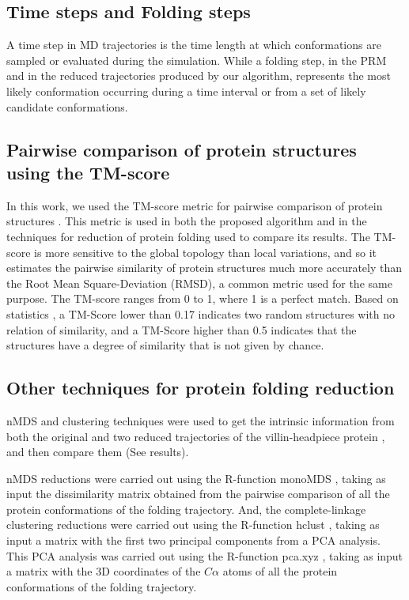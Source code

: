 \documentclass[american,twocolumn]{bmcart}
\begin{document}
\subsection*{Time steps and Folding steps}

A time step in MD trajectories is the time length at which conformations are sampled or evaluated during the simulation. While a folding step, in the PRM and in the reduced trajectories produced by our algorithm, represents the most likely conformation occurring during a time interval or from a set of likely candidate conformations.

\subsection*{Pairwise comparison of protein structures using the TM-score \label{sec:Comparing-Structures}}

In this work, we used the TM-score metric for pairwise comparison of protein structures \cite{Zhang2004}. This metric is used in both the proposed algorithm and in the techniques for reduction of protein folding used to compare its results. The TM-score is more sensitive to the global topology than local variations, and so it estimates the pairwise similarity of protein structures much more accurately than the Root Mean Square-Deviation (RMSD), a common metric used for the same purpose. The TM-score ranges from 0 to 1, where 1 is a perfect match. Based on statistics \cite{zhang2010}, a TM-Score lower than 0.17 indicates two random structures with no relation of similarity, and a TM-Score higher than 0.5 indicates that the structures have a degree of similarity that is not given by chance.

\subsection*{Other techniques for protein folding reduction \label{subsec:Techniques-for-reduction}}

nMDS and clustering techniques were used to get the intrinsic information from both the original and two reduced trajectories of the villin-headpiece protein \cite{Larson2009}, and then compare them (See results).

nMDS reductions were carried out using the R-function monoMDS \cite{Oksanen2019}, taking as input the dissimilarity matrix obtained from the pairwise comparison of all the protein conformations of the folding trajectory. And, the complete-linkage clustering reductions were carried out using the R-function hclust \cite{RCoreTeam2018}, taking as input a matrix with the first two principal components from a PCA analysis. This PCA analysis was carried out using the R-function pca.xyz \cite{Grant2006}, taking as input a matrix with the 3D coordinates of the $C\alpha$ atoms of all the protein conformations of the folding trajectory.
\end{document}
